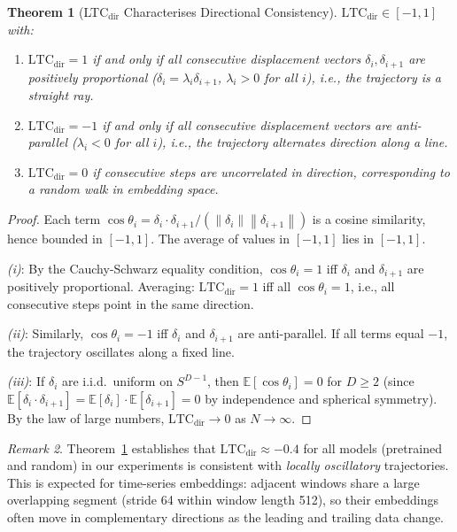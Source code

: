 \documentclass[12pt]{article}
\newtheorem{theorem}{Theorem}[section]
\theoremstyle{definition}
\theoremstyle{remark}
\newtheorem{remark}[theorem]{Remark}
\newcommand{\E}{\mathbb{E}}
\newcommand{\norm}[1]{\left\lVert #1 \right\rVert}
\newcommand{\ltcdir}{\mathrm{LTC}_{\mathrm{dir}}}
\begin{document}
\begin{theorem}[LTC$_{\mathrm{dir}}$ Characterises Directional Consistency]
\label{thm:ltcdir}
$\ltcdir \in [-1, 1]$ with:
\begin{enumerate}[label=(\roman*)]
  \item $\ltcdir = 1$ if and only if all consecutive displacement vectors
        $\delta_i, \delta_{i+1}$ are positively proportional
        ($\delta_i = \lambda_i \delta_{i+1}$, $\lambda_i > 0$ for all $i$),
        i.e., the trajectory is a straight ray.
  \item $\ltcdir = -1$ if and only if all consecutive displacement vectors
        are anti-parallel ($\lambda_i < 0$ for all $i$), i.e., the
        trajectory alternates direction along a line.
  \item $\ltcdir = 0$ if consecutive steps are uncorrelated in direction,
        corresponding to a random walk in embedding space.
\end{enumerate}
\end{theorem}

\begin{proof}
Each term $\cos\theta_i = \delta_i \cdot \delta_{i+1} /
(\norm{\delta_i}\norm{\delta_{i+1}})$ is a cosine similarity, hence bounded
in $[-1,1]$. The average of values in $[-1,1]$ lies in $[-1,1]$.

\emph{(i)}: By the Cauchy-Schwarz equality condition,
$\cos\theta_i = 1$ iff $\delta_i$ and $\delta_{i+1}$ are positively
proportional. Averaging: $\ltcdir = 1$ iff all $\cos\theta_i = 1$, i.e.,
all consecutive steps point in the same direction.

\emph{(ii)}: Similarly, $\cos\theta_i = -1$ iff $\delta_i$ and
$\delta_{i+1}$ are anti-parallel. If all terms equal $-1$, the trajectory
oscillates along a fixed line.

\emph{(iii)}: If $\delta_i$ are i.i.d.\ uniform on $S^{D-1}$, then
$\E[\cos\theta_i] = 0$ for $D \geq 2$ (since
$\E[\delta_i \cdot \delta_{i+1}] = \E[\delta_i]\cdot\E[\delta_{i+1}] = 0$
by independence and spherical symmetry). By the law of large numbers,
$\ltcdir \to 0$ as $N \to \infty$.
\end{proof}

\begin{remark}
Theorem~\ref{thm:ltcdir} establishes that $\ltcdir \approx -0.4$ for all
models (pretrained and random) in our experiments is consistent with
\emph{locally oscillatory} trajectories. This is expected for time-series
embeddings: adjacent windows share a large overlapping segment (stride 64
within window length 512), so their embeddings often move in complementary
directions as the leading and trailing data change.
\end{remark}
\end{document}
